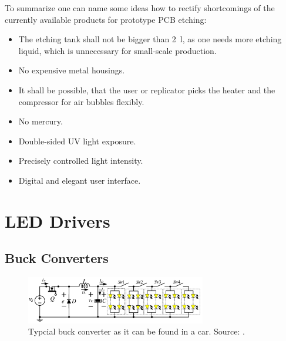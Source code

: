 \newpar
To summarize one can name some ideas how to rectify shortcomings of the currently available products for prototype \gls{PCB} etching: 
\begin{itemize}
\item The etching tank shall not be bigger than \SI{2}{\litre}, as one needs more etching liquid, which is unnecessary for small-scale production. 
\item No expensive metal housings. 
\item It shall be possible, that the user or replicator picks the heater and the compressor for air bubbles flexibly. 
\item No mercury. 
\item Double-sided \gls{UV} light exposure.
\item Precisely controlled light intensity. 
\item Digital and elegant user interface. 
\end{itemize}

\section{LED Drivers}
\label{sec:leddrivers}

\subsection{Buck Converters}
\label{subsec:buck_conv}

\begin{figure}[H]                                                         
\centering          
\includegraphics[width=0.7\textwidth]{./fig/buck1}   
\caption[Typcial buck converter as it can be found in a car.]{Typcial buck converter as it can be found in a car. Source: \cite{conference:buck1}.}   
\label{fig:buck1}                                                       
\end{figure}  

